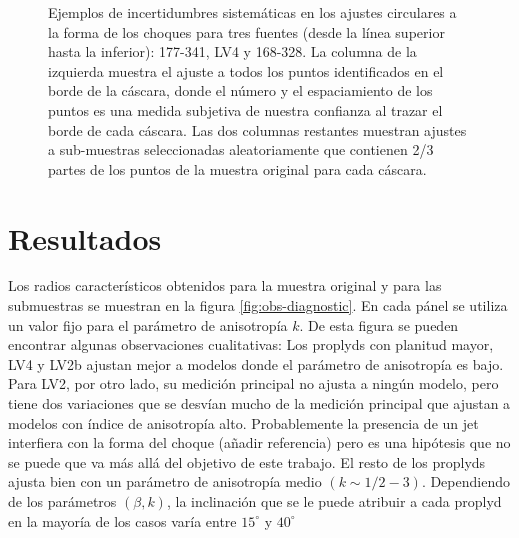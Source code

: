 \begin{figure}
\begin{tabular}{@{}c@{}c@{}c@{}}
\end{tabular}
\caption{Ejemplos de incertidumbres sistemáticas en los ajustes circulares a la forma de los choques para tres fuentes (desde la línea superior hasta la inferior): 177-341, LV4 y 168-328. La columna de la izquierda muestra el ajuste a todos los puntos identificados en el borde de la cáscara, donde el número y el espaciamiento de los puntos es una medida subjetiva de nuestra confianza al trazar el borde de cada cáscara. Las dos columnas restantes muestran ajustes a sub-muestras seleccionadas aleatoriamente que contienen 2/3 partes de los puntos de la muestra original para cada cáscara.}
\label{fig:char-radii-obs}
\end{figure}

\section{Resultados}

Los radios característicos obtenidos para la muestra original y para las submuestras se muestran en la figura \ref{fig:obs-diagnostic}. En cada pánel se utiliza un valor fijo para el parámetro de anisotropía $k$. De esta figura se pueden encontrar algunas observaciones cualitativas: Los proplyds con planitud mayor, LV4 y LV2b ajustan mejor a modelos donde el parámetro de anisotropía es bajo. Para LV2, por otro lado, su medición principal no ajusta a ningún modelo, pero tiene dos variaciones que se desvían mucho de la medición principal que ajustan a modelos con índice de anisotropía alto. Probablemente la presencia de un jet interfiera con la forma del choque (añadir referencia) pero es una hipótesis que no se puede que va más allá del objetivo de este trabajo. El resto de los proplyds ajusta bien con un parámetro de anisotropía medio $(k\sim 1/2 - 3)$. Dependiendo de los parámetros $(\beta, k)$, la inclinación que se le puede atribuir a cada proplyd en la mayoría de los casos varía entre $15^\circ$ y $40^\circ$  

